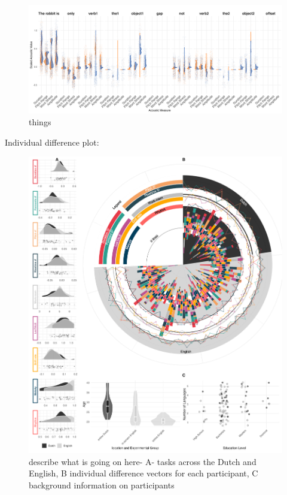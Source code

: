 \begin{figure}[H]  %
    \centering
    \includegraphics[width=\textwidth,height=\textheight,keepaspectratio]{viz/acoustic_faceted.png}
    \caption{things}
    \label{fig:acoustic_faceted}
\end{figure}



Individual difference plot:
\clearpage
\begin{figure}[p]  %
    \centering
    \includegraphics[width=\textwidth,height=\textheight,keepaspectratio]{viz/combined_plot_circle.png}
    \caption{describe what is going on here- A- tasks across the Dutch and English, B individual difference vectors for each participant, C background information on participants}
    \label{fig:combined_plot}
\end{figure}
\clearpage

